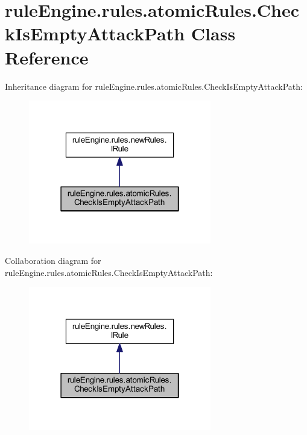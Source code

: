 \hypertarget{classrule_engine_1_1rules_1_1atomic_rules_1_1_check_is_empty_attack_path}{}\section{rule\+Engine.\+rules.\+atomic\+Rules.\+Check\+Is\+Empty\+Attack\+Path Class Reference}
\label{classrule_engine_1_1rules_1_1atomic_rules_1_1_check_is_empty_attack_path}


Inheritance diagram for rule\+Engine.\+rules.\+atomic\+Rules.\+Check\+Is\+Empty\+Attack\+Path\+:
\nopagebreak
\begin{figure}[H]
\begin{center}
\leavevmode
\includegraphics[width=226pt]{classrule_engine_1_1rules_1_1atomic_rules_1_1_check_is_empty_attack_path__inherit__graph}
\end{center}
\end{figure}


Collaboration diagram for rule\+Engine.\+rules.\+atomic\+Rules.\+Check\+Is\+Empty\+Attack\+Path\+:
\nopagebreak
\begin{figure}[H]
\begin{center}
\leavevmode
\includegraphics[width=226pt]{classrule_engine_1_1rules_1_1atomic_rules_1_1_check_is_empty_attack_path__coll__graph}
\end{center}
\end{figure}

